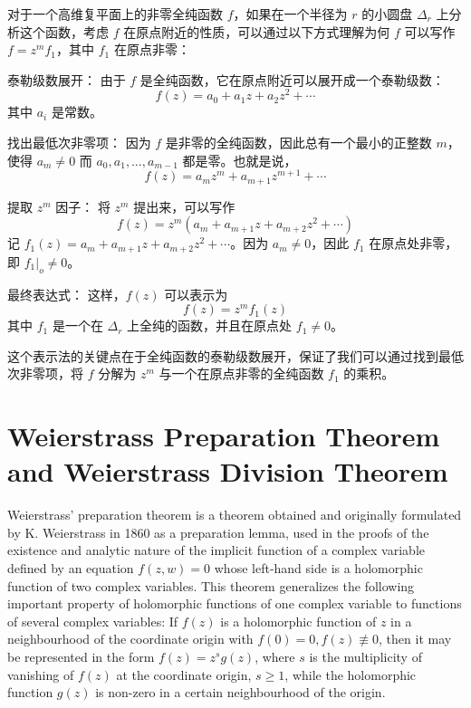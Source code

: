 \documentclass[lang=cn,12pt,a4paper,fontset=none]{beautybook}
\begin{document}
\begin{solution}
   对于一个高维复平面上的非零全纯函数 \( f \)，如果在一个半径为 \( r \) 的小圆盘 \( \Delta_r \) 上分析这个函数，考虑 \( f \) 在原点附近的性质，可以通过以下方式理解为何 \( f \) 可以写作 \( f = z^m f_1 \)，其中 \( f_1 \) 在原点非零：

泰勒级数展开：
   由于 \( f \) 是全纯函数，它在原点附近可以展开成一个泰勒级数：
   \[
   f(z) = a_0 + a_1 z + a_2 z^2 + \cdots
   \]
   其中 \( a_i \) 是常数。

找出最低次非零项：
   因为 \( f \) 是非零的全纯函数，因此总有一个最小的正整数 \( m \)，使得 \( a_m \neq 0 \) 而 \( a_0, a_1, \ldots, a_{m-1} \) 都是零。也就是说，
   \[
   f(z) = a_m z^m + a_{m+1} z^{m+1} + \cdots
   \]

提取 \( z^m \) 因子：
   将 \( z^m \) 提出来，可以写作
   \[
   f(z) = z^m (a_m + a_{m+1} z + a_{m+2} z^2 + \cdots)
   \]
   记 \( f_1(z) = a_m + a_{m+1} z + a_{m+2} z^2 + \cdots \)。因为 \( a_m \neq 0 \)，因此 \( f_1 \) 在原点处非零，即 \( f_1|_o \neq 0 \)。

最终表达式：
   这样，\( f(z) \) 可以表示为
   \[
   f(z) = z^m f_1(z)
   \]
   其中 \( f_1 \) 是一个在 \( \Delta_r \) 上全纯的函数，并且在原点处 \( f_1 \neq 0 \)。

这个表示法的关键点在于全纯函数的泰勒级数展开，保证了我们可以通过找到最低次非零项，将 \( f \) 分解为 \( z^m \) 与一个在原点非零的全纯函数 \( f_1 \) 的乘积。
\end{solution}


\section{Weierstrass Preparation Theorem and Weierstrass Division Theorem}

Weierstrass' preparation theorem is a theorem obtained and originally formulated by K. Weierstrass in 1860 as a preparation lemma, used in the proofs of the existence and analytic nature of the implicit function of a complex variable defined by an equation $f(z,w)=0$ whose left-hand side is a holomorphic function of two complex variables. This theorem generalizes the following important property of holomorphic functions of one complex variable to functions of several complex variables: If $f(z)$ is a holomorphic function of $z$ in a neighbourhood of the coordinate origin with $f(0)=0, f(z)\not\equiv 0$, then it may be represented in the form $f(z)=z^s g(z)$, where $s$ is the multiplicity of vanishing of $f(z)$ at the coordinate origin, $s\geq 1$, while the holomorphic function $g(z)$ is non-zero in a certain neighbourhood of the origin.
\end{document}
